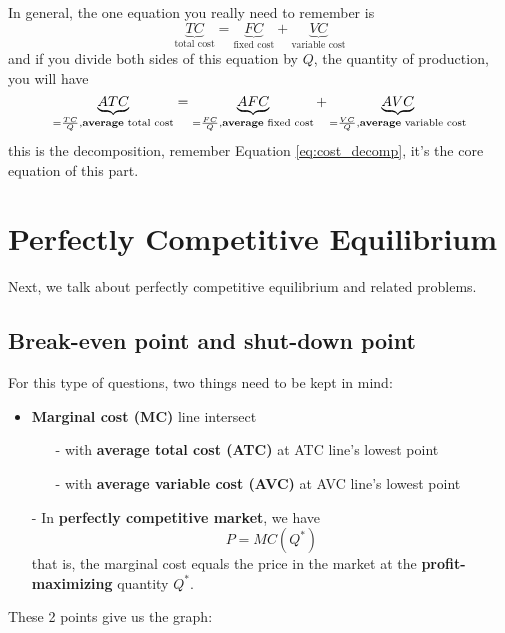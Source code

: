 \documentclass[twoside]{article}
\theoremstyle{definition}
\begin{document}
In general, the one equation you really need to remember is
\begin{equation}\label{eq:cost_decomp}
    \underbrace{TC}_{\text{total cost}} = \underbrace{FC}_{\text{fixed cost}} + \underbrace{VC}_{\text{variable cost}}
\end{equation}
and if you divide both sides of this equation by $Q$, the quantity of production, you will have
$$
\underbrace{ATC}_{=\frac{TC}{Q},\text{\textbf{average} total cost}} = \underbrace{AFC}_{=\frac{FC}{Q},\text{\textbf{average} fixed cost}} + \underbrace{AVC}_{=\frac{VC}{Q},\text{\textbf{average} variable cost}}
$$
this is the decomposition, remember Equation \ref{eq:cost_decomp}, it's the core equation of this part.

\section{Perfectly Competitive Equilibrium}

Next, we talk about perfectly competitive equilibrium and related problems.

\subsection{Break-even point and shut-down point}

For this type of questions, two things need to be kept in mind:
\begin{itemize}
    \item \textbf{Marginal cost (MC)} line intersect 
    \begin{itemize}
        \item[-] with \textbf{\color{red!55!black}average total cost (ATC)} at ATC line's lowest point
        \item[-] with \textbf{\color{blue!45!black}average variable cost (AVC)} at AVC line's lowest point
    \end{itemize}
    \item[-] In \textbf{perfectly competitive market}, we have 
    $$
    P = MC(Q^*)
    $$
    that is, the marginal cost equals the price in the market at the \textbf{profit-maximizing} quantity $Q^*$.
\end{itemize}

These 2 points give us the graph:
\end{document}
